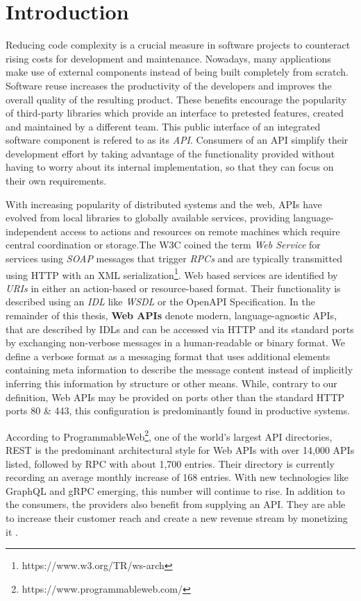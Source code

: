 \chapter{Introduction}
\label{ch:Introduction}

Reducing code complexity is a crucial measure in software projects to counteract rising costs for development and maintenance. Nowadays, many applications make use of external components instead of being built completely from scratch. Software reuse increases the productivity of the developers and improves the overall quality of the resulting product. These benefits encourage the popularity of third-party libraries which provide an interface to pretested features, created and maintained by a different team. This public interface of an integrated software component is refered to as its \textit{\ac{API}}. Consumers of an \ac{API} simplify their development effort by taking advantage of the functionality provided without having to worry about its internal implementation, so that they can focus on their own requirements. 

With increasing popularity of distributed systems and the web, APIs have evolved from local libraries to globally available services, providing language-independent access to actions and resources on remote machines which require central coordination or storage.The \ac{W3C} coined the term \textit{Web Service} for services using \textit{\ac{SOAP}} messages that trigger \textit{\acp{RPC}} and are typically transmitted using HTTP with an \acs{XML} serialization\footnote{https://www.w3.org/TR/ws-arch}. Web based services are identified by \textit{\acp{URI}} in either an action-based or resource-based format. Their functionality is described using an \textit{\ac{IDL}} like \textit{\ac{WSDL}} or the OpenAPI Specification. In the remainder of this thesis, \textbf{Web APIs} denote modern, language-agnostic \acp{API}, that are described by \acp{IDL} and can be accessed via HTTP and its standard ports by exchanging non-verbose messages in a human-readable or binary format. We define a verbose format as a messaging format that uses additional elements containing meta information to describe the message content instead of implicitly inferring this information by structure or other means. While, contrary to our definition, Web APIs may be provided on ports other than the standard HTTP ports 80 \& 443, this configuration is predominantly found in productive systems.

 According to ProgrammableWeb\footnote{https://www.programmableweb.com/}, one of the world's largest \ac{API} directories, \acs{REST} is the predominant architectural style for Web APIs with over 14,000 \acp{API} listed, followed by \ac{RPC} with about 1,700 entries. Their directory is currently recording an average monthly increase of 168 entries. With new technologies like GraphQL and gRPC emerging, this number will continue to rise. In addition to the consumers, the providers also benefit from supplying an \ac{API}. They are able to increase their customer reach and create a new revenue stream by monetizing it \cite[p. 243]{koci_classification_2019}. 


